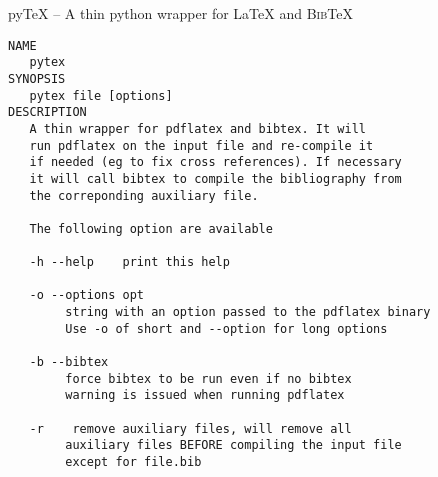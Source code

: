 \documentclass{article}
\begin{document}
py{\TeX} -- A thin python \cite{python} wrapper for {\LaTeX} and \textsc{Bib}\TeX

\begin{verbatim}
NAME
   pytex
SYNOPSIS
   pytex file [options]
DESCRIPTION
   A thin wrapper for pdflatex and bibtex. It will
   run pdflatex on the input file and re-compile it
   if needed (eg to fix cross references). If necessary
   it will call bibtex to compile the bibliography from
   the correponding auxiliary file.

   The following option are available

   -h --help	print this help

   -o --options	opt
        string with an option passed to the pdflatex binary
        Use -o of short and --option for long options

   -b --bibtex
        force bibtex to be run even if no bibtex
        warning is issued when running pdflatex

   -r 	 remove auxiliary files, will remove all
        auxiliary files BEFORE compiling the input file
        except for file.bib
\end{verbatim}



\end{document}
